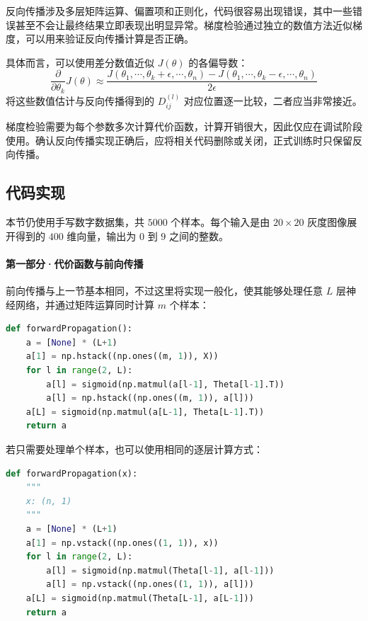 反向传播涉及多层矩阵运算、偏置项和正则化，代码很容易出现错误，其中一些错误甚至不会让最终结果立即表现出明显异常。梯度检验通过独立的数值方法近似梯度，可以用来验证反向传播计算是否正确。

具体而言，可以使用差分数值近似 $J(\theta)$ 的各偏导数：
\[
\frac{\partial}{\partial \theta_k}J(\theta)\approx\frac{J(\theta_1,\cdots,\theta_k+
\epsilon,\cdots,\theta_n)-J(\theta_1,\cdots,\theta_k-
\epsilon,\cdots,\theta_n)}{2\epsilon}
\]
将这些数值估计与反向传播得到的 $D_{ij}^{(l)}$ 对应位置逐一比较，二者应当非常接近。

\begin{note}
梯度检验需要为每个参数多次计算代价函数，计算开销很大，因此仅应在调试阶段使用。确认反向传播实现正确后，应将相关代码删除或关闭，正式训练时只保留反向传播。 
\end{note}


\subsection{代码实现}

本节仍使用手写数字数据集，共 $5000$ 个样本。每个输入是由 $20\times20$ 灰度图像展开得到的 $400$ 维向量，输出为 $0$ 到 $9$ 之间的整数。

\paragraph{第一部分·代价函数与前向传播}

前向传播与上一节基本相同，不过这里将实现一般化，使其能够处理任意 $L$ 层神经网络，并通过矩阵运算同时计算 $m$ 个样本：

\begin{lstlisting}[language=Python]
def forwardPropagation():
	a = [None] * (L+1)
	a[1] = np.hstack((np.ones((m, 1)), X))
	for l in range(2, L):
		a[l] = sigmoid(np.matmul(a[l-1], Theta[l-1].T))
		a[l] = np.hstack((np.ones((m, 1)), a[l]))
	a[L] = sigmoid(np.matmul(a[L-1], Theta[L-1].T))
	return a
\end{lstlisting}

若只需要处理单个样本，也可以使用相同的逐层计算方式：

\begin{lstlisting}[language=Python]
def forwardPropagation(x):
	"""
	x: (n, 1)
	"""
	a = [None] * (L+1)
	a[1] = np.vstack((np.ones((1, 1)), x))
	for l in range(2, L):
		a[l] = sigmoid(np.matmul(Theta[l-1], a[l-1]))
		a[l] = np.vstack((np.ones((1, 1)), a[l]))
	a[L] = sigmoid(np.matmul(Theta[L-1], a[L-1]))
	return a
\end{lstlisting}

